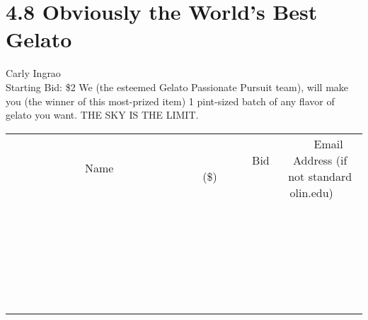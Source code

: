 \documentclass[11pt]{article}
\begin{document}
\section*{4.8 Obviously the World's Best Gelato}
Carly Ingrao
\\
Starting Bid: \$2
\newline
We (the esteemed Gelato Passionate Pursuit team), will make you (the winner of this most-prized item) 1 pint-sized batch of any flavor of gelato you want. THE SKY IS THE LIMIT.
\\[6ex]
\begin{tabular}{c c c}
~~~~~~~~~~~~~Name~~~~~~~~~~~~~ & ~~~~~~~~~Bid (\$)~~~~~~~~~  & ~~~Email Address (if not standard olin.edu)~~~\\
 & & \\
\hline
 & & \\
\hline
 & & \\
\hline
 & & \\
\hline
 & & \\
\hline
 & & \\
\hline
 & & \\
\hline
 & & \\
\hline
 & & \\
\hline
 & & \\
\hline
 & & \\
\hline
 & & \\
\hline
 & & \\
\hline
 & & \\
\hline
 & & \\
\hline
 & & \\
\hline
 & & \\
\hline
 & & \\
\hline
 & & \\
\hline
 & & \\
\hline
 & & \\
\hline
 & & \\
\hline
 & & \\
\hline
 & & \\
\hline
 & & \\
\hline
 & & \\
\hline
\end{tabular}
\newpage
\end{document}
